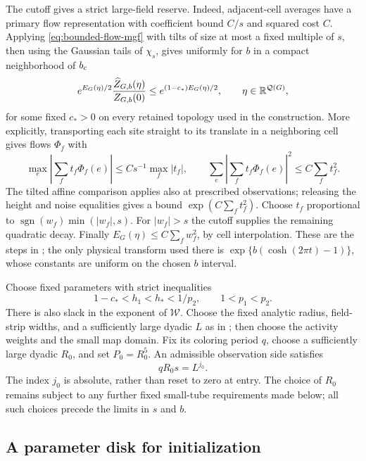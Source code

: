 The cutoff gives a strict large-field reserve.  Indeed, adjacent-cell
averages have a primary flow representation with coefficient bound
$C/s$ and squared cost $C$.  Applying
\eqref{eq:bounded-flow-mgf} with tilts of size at most a fixed multiple
of $s$, then using the Gaussian tails of $\chi_s$, gives uniformly for
$b$ in a compact neighborhood of $b_c$
\begin{equation}\label{eq:entry-large-field}
 e^{E_G(\eta)/2}\frac{\widehat Z_{G,b}(\eta)}{Z_{G,b}(0)}
             \le e^{(1-c_*)E_G(\eta)/2},\qquad \eta\in\mathbb R^{\mathcal Q(G)},
\end{equation}
for some fixed $c_*>0$ on every retained topology used in the
construction.  More explicitly, transporting each site straight to its
translate in a neighboring cell gives flows $\Phi_f$ with
\[
 \max_e\left|\sum_ft_f\Phi_f(e)\right|\le Cs^{-1}\max_f|t_f|,
 \qquad \sum_e\left|\sum_ft_f\Phi_f(e)\right|^2\le C\sum_ft_f^2.
\]
The tilted affine comparison applies also at prescribed observations;
releasing the height and noise equalities gives a bound
$\exp(C\sum_ft_f^2)$.  Choose
$t_f$ proportional to $\operatorname{sgn}(w_f)\min(|w_f|,s)$.
For $|w_f|>s$ the cutoff supplies the remaining quadratic decay.
Finally $E_G(\eta)\le C\sum_fw_f^2$, by cell interpolation.
These are the steps in \cite[Lemma~4.4 and Equation~(57)]{F}; the only physical transform
used there is $\exp\{b(\cosh(2\pi t)-1)\}$, whose constants are uniform
on the chosen $b$ interval.

Choose fixed parameters with strict inequalities
\begin{equation}\label{eq:entry-reserves}
        1-c_*<h_1<h_*<1/p_2,\qquad 1<p_1<p_2.
\end{equation}
There is also slack in the exponent of $\mathscr W$.  Choose the fixed
analytic radius, field-strip widths, and a sufficiently large dyadic
$L$ as in \cite{F}; then choose the activity weights and the small
map domain.  Fix its coloring period $q$, choose a sufficiently large
dyadic $R_0$, and set $P_0=R_0^5$.  An admissible observation side
satisfies
\begin{equation}\label{eq:entry-side}
                         qR_0s=L^{j_0}.
\end{equation}
The index $j_0$ is absolute, rather than reset to zero at entry.
The choice of $R_0$ remains subject to any further fixed small-tube
requirements made below; all such choices precede the limits in $s$
and $b$.

\subsection{A parameter disk for initialization}

